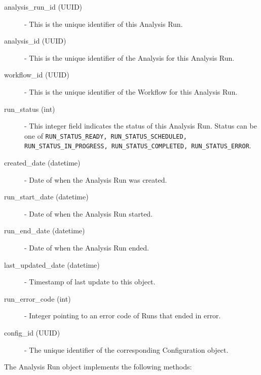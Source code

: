 \begin{description}
\item [analysis\_run\_id (UUID)] - This is the unique identifier of this Analysis Run.
\item [analysis\_id (UUID)] - This is the unique identifier of the Analysis for this Analysis Run.
\item [workflow\_id (UUID)] - This is the unique identifier of the Workflow for this Analysis Run.
\item [run\_status (int)] - This integer field indicates the status of this Analysis Run. Status can be one of \texttt{RUN_STATUS_READY, RUN_STATUS_SCHEDULED, RUN_STATUS_IN_PROGRESS, RUN_STATUS_COMPLETED, RUN_STATUS_ERROR}.
\item [created\_date (datetime)] - Date of when the Analysis Run was created.
\item [run\_start\_date (datetime)] - Date of when the Analysis Run started.
\item [run\_end\_date (datetime)] - Date of when the Analysis Run ended.
\item [last\_updated\_date (datetime)] - Timestamp of last update to this object.
\item [run\_error\_code (int)] - Integer pointing to an error code of Runs that ended in error.
\item [config\_id (UUID)] - The unique identifier of the corresponding Configuration object.
\end{description}

The Analysis Run object implements the following methods:

